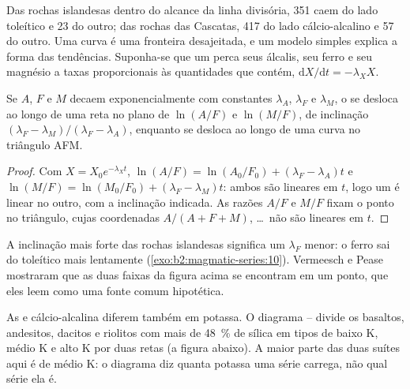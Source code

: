 Das rochas islandesas dentro do alcance da linha divisória, 351 caem do lado
toleítico e 23 do outro; das rochas das Cascatas, 417 do lado cálcio-alcalino
e 57 do outro. Uma curva é uma fronteira desajeitada, e um modelo simples explica
a forma das tendências. Suponha-se que um  perca seus álcalis, seu ferro e seu magnésio
a taxas proporcionais às quantidades que contém, $\mathrm dX/\mathrm dt = -\lambda_X X$.

\begin{proposition}\label{prop:b2:magmatic-series:logratio}
Se $A$, $F$ e $M$ decaem exponencialmente com constantes $\lambda_A$, $\lambda_F$ e
$\lambda_M$, o  se desloca ao longo de uma reta no plano de $\ln(A/F)$ e
$\ln(M/F)$, de inclinação $(\lambda_F - \lambda_M)/(\lambda_F - \lambda_A)$, enquanto se desloca
ao longo de uma curva no triângulo AFM.
\end{proposition}

\begin{proof}
Com $X = X_0 e^{-\lambda_X t}$, $\ln(A/F) = \ln(A_0/F_0) + (\lambda_F - \lambda_A)t$
e $\ln(M/F) = \ln(M_0/F_0) + (\lambda_F - \lambda_M)t$: ambos são lineares em $t$, logo
um é linear no outro, com a inclinação indicada. As razões $A/F$ e $M/F$ fixam o
ponto no triângulo, cujas coordenadas $A/(A + F + M)$, \dots\ não são lineares em $t$.
\end{proof}

A inclinação mais forte das rochas islandesas significa um $\lambda_F$ menor: o ferro sai
do  toleítico mais lentamente (\cref{exo:b2:magmatic-series:10}). Vermeesch e Pease mostraram que as duas
faixas da figura acima se encontram em um ponto, que eles leem como uma fonte comum
hipotética.

As  e cálcio-alcalina diferem também em potassa. O
diagrama -- divide os basaltos, andesitos, dacitos e riolitos com
mais de \qty{48}{\percent} de sílica em tipos de baixo K, médio K e alto K por duas
retas (a figura abaixo). A maior parte das duas suítes aqui é de médio K: o
diagrama diz quanta potassa uma série carrega, não qual série ela é.

